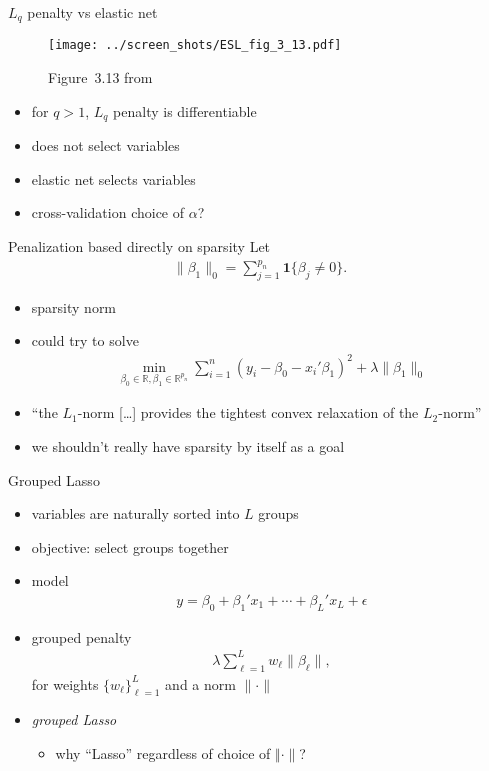 \documentclass[xcolor=dvipsnames, handout]{beamer}
\begin{document}
\begin{frame}{$L_q$ penalty vs elastic net}
\begin{figure}
  \texttt{[image: ../screen\_shots/ESL\_fig\_3\_13.pdf]}
   \caption{Figure~3.13 from \textcite{hastie2009elements}}
\end{figure}
\begin{itemize}[<+->]
  \item for $q > 1$, $L_q$ penalty is differentiable
  \item does not select variables 
  \item elastic net selects variables 
  \item cross-validation choice of $\alpha$?
\end{itemize}
\end{frame}

\begin{frame}{Penalization based directly on sparsity}
Let 
\begin{align*}
  \lVert \beta_1 \rVert_0 = \sum_{j = 1}^{p_n} \mathbf{1}\{\beta_j \neq 0\}.
\end{align*}
\begin{itemize}[<+->]
  \item sparsity norm
  \item could try to solve
  \begin{align*}
    \min_{\beta_0 \in \mathbb{R}, \beta_1 \in \mathbb{R}^{p_n}} \sum_{i=1}^n (y_i - \beta_0 - x_i'\beta_1)^2  + \lambda \lVert \beta_1 \rVert_0
  \end{align*}
  \item ``the $L_1$-norm [\dots] provides the tightest convex relaxation of the $L_2$-norm'' \parencite{she2012iterative}
  \item we shouldn't really have sparsity by itself as a goal
\end{itemize}
\end{frame}

\begin{frame}{Grouped Lasso}
\begin{itemize}[<+->]
  \item variables are naturally sorted into $L$ groups 
  \item objective: select groups together
  \item model 
  \begin{align*}
    y = \beta_0 + \beta_1'x_1 + \dotsm + \beta_L' x_L + \epsilon 
  \end{align*}
  \item grouped penalty 
  \begin{align*}
    \lambda \sum_{\ell = 1}^L w_\ell \lVert{\beta_{\ell}}\rVert,
  \end{align*}
  for weights $\{w_{\ell}\}_{\ell = 1}^{L}$ and a norm $\lVert \cdot \rVert$
  \item \emph{grouped Lasso} \parencite{bakin1999adaptive,yuan2006model}
  \begin{itemize}
    \item why ``Lasso'' regardless of choice of $\Vert \cdot \rVert$?
  \end{itemize}
\end{itemize}
\end{frame}
\end{document}
